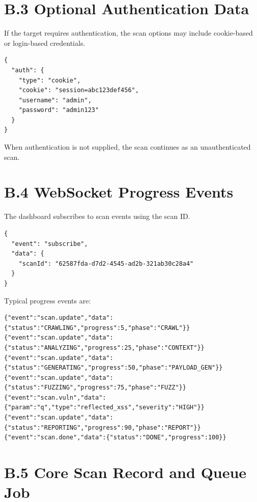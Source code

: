 \section*{B.3 Optional Authentication Data}

If the target requires authentication, the scan options may include cookie-based or login-based credentials.

\begin{lstlisting}[style=appendixcode,caption={Optional authentication options}]
{
  "auth": {
    "type": "cookie",
    "cookie": "session=abc123def456",
    "username": "admin",
    "password": "admin123"
  }
}
\end{lstlisting}

When authentication is not supplied, the scan continues as an unauthenticated scan.

\section*{B.4 WebSocket Progress Events}

The dashboard subscribes to scan events using the scan ID.

\begin{lstlisting}[style=appendixcode,caption={WebSocket subscription message}]
{
  "event": "subscribe",
  "data": {
    "scanId": "62587fda-d7d2-4545-ad2b-321ab30c28a4"
  }
}
\end{lstlisting}

Typical progress events are:

\begin{lstlisting}[style=appendixcode,caption={WebSocket scan event sequence}]
{"event":"scan.update","data":{"status":"CRAWLING","progress":5,"phase":"CRAWL"}}
{"event":"scan.update","data":{"status":"ANALYZING","progress":25,"phase":"CONTEXT"}}
{"event":"scan.update","data":{"status":"GENERATING","progress":50,"phase":"PAYLOAD_GEN"}}
{"event":"scan.update","data":{"status":"FUZZING","progress":75,"phase":"FUZZ"}}
{"event":"scan.vuln","data":{"param":"q","type":"reflected_xss","severity":"HIGH"}}
{"event":"scan.update","data":{"status":"REPORTING","progress":90,"phase":"REPORT"}}
{"event":"scan.done","data":{"status":"DONE","progress":100}}
\end{lstlisting}

\section*{B.5 Core Scan Record and Queue Job}

